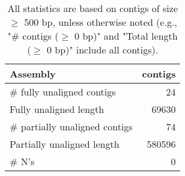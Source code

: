 \documentclass[12pt,a4paper]{article}
\begin{document}
\begin{table}[ht]
\begin{center}
\caption{All statistics are based on contigs of size $\geq$ 500 bp, unless otherwise noted (e.g., "\# contigs ($\geq$ 0 bp)" and "Total length ($\geq$ 0 bp)" include all contigs).}
\begin{tabular}{|l*{1}{|r}|}
\hline
Assembly & contigs \\ \hline
\# fully unaligned contigs & 24 \\ \hline
Fully unaligned length & 69630 \\ \hline
\# partially unaligned contigs & 74 \\ \hline
Partially unaligned length & 580596 \\ \hline
\# N's & 0 \\ \hline
\end{tabular}
\end{center}
\end{table}
\end{document}
